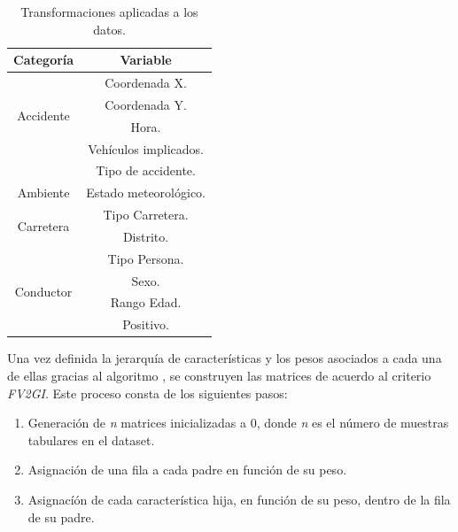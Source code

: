         \begin{table}[H]
          \centering
          \begin{tabular}{ |c|c| }
               \hline
               \textbf{Categoría} & \textbf{Variable}\\

               \hline
               \multirow{4}{*}{Accidente}            & Coordenada X.\\
                                                     & Coordenada Y.\\
                                                     & Hora.\\
                                                     & Vehículos implicados.\\
                                                     & Tipo de accidente.\\

               \hline
               \multirow{1}{*}{Ambiente}             & Estado meteorológico.\\

               \hline
               \multirow{2}{*}{Carretera}            & Tipo Carretera.\\
                                                     & Distrito.\\

               \hline
               \multirow{4}{*}{Conductor}            & Tipo Persona.\\
                                                     & Sexo.\\
                                                     & Rango Edad.\\
                                                     & Positivo.\\

               \hline
          \end{tabular}
          \caption{Transformaciones aplicadas a los datos.}
          \label{JerarquiaCaracteristicasTabla}
        \end{table}



        Una vez definida la jerarquía de características y los pesos asociados a cada una de ellas gracias al algoritmo , se construyen las matrices de acuerdo al criterio \textit{FV2GI}. Este proceso consta de los siguientes pasos:

        \begin{enumerate}

            \item Generación de \textit{n} matrices inicializadas a 0, donde \textit{n} es el número de muestras tabulares en el dataset.
            \item Asignación de una fila a cada padre en función de su peso.
            \item Asignacíón de cada característica hija, en función de su peso, dentro de la fila de su padre.
        
        \end{enumerate}


